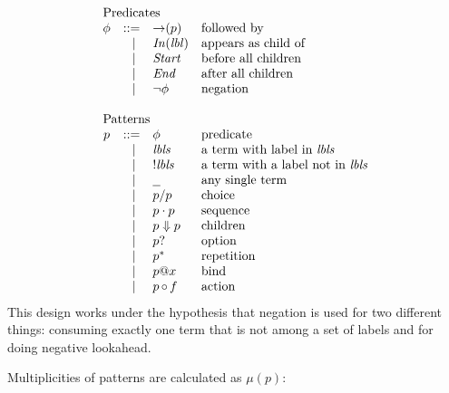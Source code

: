 \documentclass{article}
\makeatletter
\newcommand{\lbl}{\ensuremath{\mathit{lbl}}}
\newcommand{\lbls}{\ensuremath{\mathit{lbls}}}
\newcommand{\pseq}[2]{\ensuremath{#1 \cdot #2}}
\newcommand{\por}[2]{\ensuremath{#1/#2}}
\newcommand{\children}[2]{\ensuremath{#1} \Downarrow #2}
\newcommand{\pnot}[1]{\ensuremath{\lnot #1}}
\newcommand{\maybe}[1]{\ensuremath{#1?}}
\newcommand{\many}[1]{\ensuremath{#1^*}}
\newcommand{\any}{\ensuremath{\text{\underline{\hspace{0.6em}}}}}
\newcommand{\bind}[2]{\ensuremath{#1@#2}}
\newcommand{\paction}[2]{\ensuremath{#1\mathop{\circ} #2}}
\newcommand{\fb}[1]{\ensuremath{\mathop{\rightarrow}(#1)}}
\newcommand{\pin}[1]{\ensuremath{\mathit{In}(#1)}}
\newcommand{\pstart}{\ensuremath{\mathit{Start}}}
\newcommand{\pend}{\ensuremath{\mathit{End}}}
\newcommand{\arrayheading}[2]{\multicolumn{#1}{l}{\mbox{#2}}}
\makeatother
\begin{document}
\[
  \begin{array}{crll}
    \arrayheading{4}{Predicates}\\
      \phi & ::= & \fb{p}      & \text{followed by}         \\
           & ~|~ & \pin{\lbl}  & \text{appears as child of} \\
           & ~|~ & \pstart{}   & \text{before all children} \\
           & ~|~ & \pend{}     & \text{after all children}  \\
           & ~|~ & \pnot{\phi} & \text{negation}            \\
      \\
    \arrayheading{4}{Patterns}\\
      p & ::= & \phi            & \text{predicate}                          \\
        & ~|~ & \lbls           & \text{a term with label in $\lbls$}       \\
        & ~|~ & !\lbls          & \text{a term with a label not in $\lbls$} \\
        & ~|~ & \any{}          & \text{any single term}                    \\
        & ~|~ & \por{p}{p}      & \text{choice}                             \\
        & ~|~ & \pseq{p}{p}     & \text{sequence}                           \\
        & ~|~ & \children{p}{p} & \text{children}                           \\
        & ~|~ & \maybe{p}       & \text{option}                             \\
        & ~|~ & \many{p}        & \text{repetition}                         \\
        & ~|~ & \bind{p}{x}     & \text{bind}                               \\
        & ~|~ & \paction{p}{f}  & \text{action}                             \\
  \end{array}
\]
%
This design works under the hypothesis that negation is used for
two different things: consuming exactly one term that is not among
a set of labels and for doing negative lookahead.

Multiplicities of patterns are calculated as $\mu(p)$:
\end{document}
